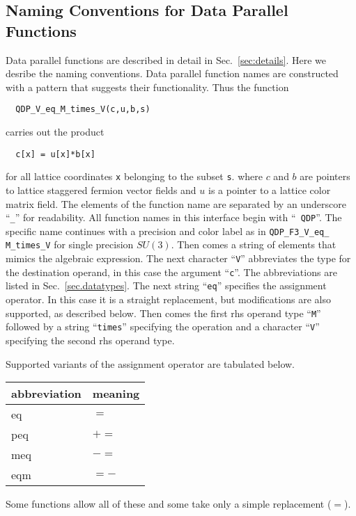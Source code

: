 \documentclass{article}
\newcommand{\ttdash}{{\tt \_}}
\begin{document}
\subsection{Naming Conventions for Data Parallel Functions}

Data parallel functions are described in detail in Sec.~\ref{sec:details}.  Here we desribe the naming conventions.  Data parallel function names are constructed with a pattern that suggests their functionality.  Thus the function
%
\begin{verbatim}
  QDP_V_eq_M_times_V(c,u,b,s)
\end{verbatim}
%
carries out the product
%
\begin{verbatim}
  c[x] = u[x]*b[x]
\end{verbatim}
%
for all lattice coordinates {\tt x} belonging to the subset {\tt s}.
where $c$ and $b$ are pointers to lattice staggered fermion vector
fields and $u$ is a pointer to a lattice color matrix field.  The elements of
the function name are separated by an underscore ``{\tt \_}'' for
readability.  All function names in this interface begin with ``{\tt
QDP}''.  The specific name continues with a precision and color label
as in {\tt QDP}\ttdash{\tt F3}\ttdash{\tt V}\ttdash{\tt eq}\ttdash{\tt
M}\ttdash{\tt times}\ttdash{\tt V} for single precision $SU(3)$.  Then
comes a string of elements that mimics the algebraic expression.  The
next character ``{\tt V}'' abbreviates the type for the destination
operand, in this case the argument ``{\tt c}''.  The abbreviations are
listed in Sec.~\ref{sec.datatypes}.  The next string ``{\tt eq}''
specifies the assignment operator.  In this case it is a straight
replacement, but modifications are also supported, as described below.
Then comes the first rhs operand type ``{\tt M}'' followed by a string
``{\tt times}'' specifying the operation and a character ``{\tt V}''
specifying the second rhs operand type.

Supported variants of the assignment operator are tabulated below.
\begin{center}
\begin{tabular}{|l|l|}
\hline
 abbreviation & meaning \\
\hline
 eq   & $=$  \\
 peq  & $+=$ \\
 meq  & $-=$ \\
 eqm  & $=-$ \\
\hline
\end{tabular}
\end{center}
%
Some functions allow all of these and some take only a simple replacement ($=$).
\end{document}
